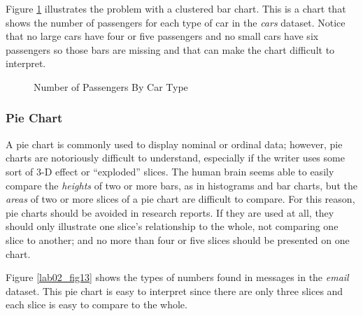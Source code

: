 Figure \ref{lab02_fig12} illustrates the problem with a clustered bar chart. This is a chart that shows the number of passengers for each type of car in the \textit{cars} dataset. Notice that no large cars have four or five passengers and no small cars have  six passengers so those bars are missing and that can make the chart difficult to interpret.

\begin{figure}[H]
  \begin{center}
    \caption{Number of Passengers By Car Type}
    \label{lab02_fig12}
  \end{center}
\end{figure}

\subsubsection{Pie Chart} A pie chart is commonly used to display nominal or ordinal data; however, pie charts are notoriously difficult to understand, especially if the writer uses some sort of $ 3 $-D effect or ``exploded'' slices. The human brain seems able to easily compare the \textit{heights} of two or more bars, as in histograms and bar charts, but the \textit{areas} of two or more slices of a pie chart are difficult to compare. For this reason, pie charts should be avoided in research reports. If they are used at all, they should only illustrate one slice's relationship to the whole, not comparing one slice to another; and no more than four or five slices should be presented on one chart.

Figure \ref{lab02_fig13} shows the types of numbers found in messages in the \textit{email} dataset. This pie chart is easy to interpret since there are only three slices and each slice is easy to compare to the whole.

